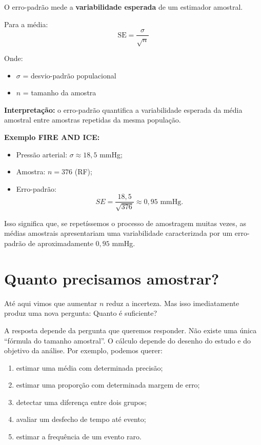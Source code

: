 O erro-padrão mede a \textbf{variabilidade esperada} de um estimador amostral.


Para a média:
\begin{equation}
  \text{SE} = \frac{\sigma}{\sqrt{n}}
\end{equation}

Onde:
\begin{itemize}
    \item $\sigma$ = desvio-padrão populacional
    \item $n$ = tamanho da amostra
\end{itemize}

\textbf{Interpretação:} o erro-padrão quantifica a variabilidade
esperada da média amostral entre amostras repetidas da mesma população.

\textbf{Exemplo FIRE AND ICE:}

\begin{itemize}
    \item Pressão arterial: $\sigma \approx 18{,}5$ mmHg;
    \item Amostra: $n=376$ (RF);
    \item Erro-padrão:
    \[
        SE = \frac{18{,}5}{\sqrt{376}}
        \approx 0{,}95\text{ mmHg}.
    \]
\end{itemize}

Isso significa que, se repetíssemos o processo de amostragem muitas vezes, as médias amostrais apresentariam uma variabilidade caracterizada por um erro-padrão de aproximadamente $0{,}95$ mmHg.

\section{Quanto precisamos amostrar?}

Até aqui vimos que aumentar $n$ reduz a incerteza. Mas isso imediatamente produz uma nova pergunta: Quanto é suficiente?

A resposta depende da pergunta que queremos responder. Não existe uma única ``fórmula do tamanho amostral''. O cálculo depende do desenho do estudo e do objetivo da análise. Por exemplo, podemos querer:

\begin{enumerate}
\item estimar uma média com determinada precisão;
\item estimar uma proporção com determinada margem de erro;
\item detectar uma diferença entre dois grupos;
\item avaliar um desfecho de tempo até evento;
\item estimar a frequência de um evento raro.
\end{enumerate}

